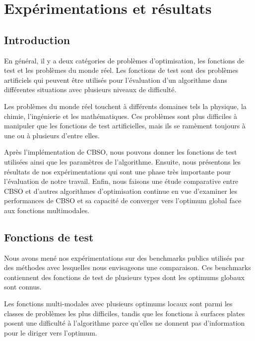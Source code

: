 \chapter{Expérimentations et résultats}

\section*{Introduction}
En général, il y a deux catégories de problèmes d'optimisation, les fonctions de test et les problèmes du monde réel. Les fonctions de test sont des problèmes artificiels qui peuvent être utilisés pour l'évaluation d'un algorithme dans différentes situations avec plusieurs niveaux de difficulté.

Les problèmes du monde réel touchent à différents domaines tels la physique, la chimie, l'ingénierie et les mathématiques. Ces problèmes sont plus difficiles à manipuler que les fonctions de test artificielles, mais ils se ramèment toujours à une ou à plusieurs d'entre elles.

Après l'implémentation de CBSO, nous pouvons donner les fonctions de test utilisées ainsi que les paramètres de l'algorithme. Ensuite, nous présentons les résultats de nos expérimentations qui sont une phase très importante pour l'évaluation de notre travail. Enfin, nous faisons une étude comparative entre CBSO et d'autres algorithmes d'optimisation continue en vue d'examiner les performances de CBSO et sa capacité de converger vers l'optimum global face aux fonctions multimodales.

\section{Fonctions de test}
Nous avons mené nos expérimentations sur des benchmarks publics utilisés par des méthodes avec lesquelles nous envisageons une comparaison. Ces benchmarks contiennent des fonctions de test de plusieurs types dont les optimums globaux sont connus.

Les fonctions multi-modales avec plusieurs optimums locaux sont parmi les classes de problèmes les plus difficiles, tandis que les fonctions à surfaces plates posent une difficulté à l'algorithme parce qu'elles ne donnent pas d'information pour le diriger vers l'optimum. 

